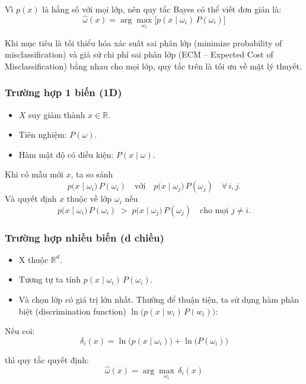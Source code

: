 \documentclass[
  a4paper,
]{article}
\providecommand{\tightlist}{%
  \setlength{\itemsep}{0pt}\setlength{\parskip}{0pt}}
\begin{document}
Vì \(p(x)\) là hằng số với mọi lớp, nên quy tắc Bayes có thể viết đơn
giản là: \[\hat{\omega}(x)
= \arg\max_{\omega_i} \bigl[p(x \mid \omega_i)\,P(\omega_i)\bigr]\]

Khi mục tiêu là tối thiểu hóa xác suất sai phân lớp (minimize
probability of misclassification) và giả sử chi phí sai phân lớp (ECM --
Expected Cost of Misclassification) bằng nhau cho mọi lớp, quy tắc trên
là tối ưu về mặt lý thuyết.

\subsubsection{Trường hợp 1 biến
(1D)}\label{trux1b0ux1eddng-hux1ee3p-1-biux1ebfn-1d}

\begin{itemize}
\tightlist
\item
  \(X\) suy giảm thành \(x \in \mathbb{R}\).
\item
  Tiên nghiệm: \(P(\omega)\).
\item
  Hàm mật độ có điều kiện: \(P(x \mid \omega)\).
\end{itemize}

Khi có mẫu mới \(x\), ta so sánh
\[p\bigl(x \mid \omega_i\bigr)\,P(\omega_i)
\quad \text{với} \quad
p\bigl(x \mid \omega_j\bigr)\,P(\omega_j)
\quad \forall\, i, j.\] Và quyết định \(x\) thuộc về lớp \(\omega_i\)
nếu \[p\bigl(x \mid \omega_i\bigr)\,P(\omega_i)
\;>\;
p\bigl(x \mid \omega_j\bigr)\,P(\omega_j)
\quad \text{cho mọi } j \neq i.\]

\subsubsection{Trường hợp nhiều biến (d
chiều)}\label{trux1b0ux1eddng-hux1ee3p-nhiux1ec1u-biux1ebfn-d-chiux1ec1u}

\begin{itemize}
\tightlist
\item
  X thuộc \(\mathbb{R}^d\).
\item
  Tương tự ta tính \(p(x \mid \omega_i) \, P(\omega_i)\).
\item
  Và chọn lớp có giá trị lớn nhất. Thường để thuận tiện, ta sử dụng hàm
  phân biệt (discrimination function)
  \(\ln\!\bigl(p(x \mid w_i)\,P(w_i)\bigr)\):
\end{itemize}

Nếu coi:
\[\delta_i(x) = \ln\bigl(p(x \mid \omega_i)\bigr) + \ln\bigl(P(\omega_i)\bigr)\]

thì quy tắc quyết định: \[\hat{\omega}(x)
= \arg\max_{\omega_i} \,\delta_i(x)\]
\end{document}
